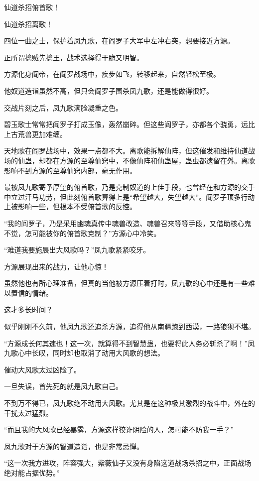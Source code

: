\begin{this_body}
仙道杀招俯首歌！

仙道杀招离歌！

四位一曲之士，保护着凤九歌，在阎罗子大军中左冲右突，想要接近方源。

正所谓擒贼先擒王，战术选择得干脆又明智。

方源化身阎帝，在阎罗战场中，疾步如飞，转移起来，自然轻松至极。

他奴道造诣虽然不高，但只会阎罗子围杀凤九歌，还是能做得很好。

交战片刻之后，凤九歌满脸凝重之色。

碧玉歌士常常把阎罗子打成玉像，轰然崩碎。但这些阎罗子，亦都各个骁勇，远比上古荒兽更加难缠。

天地歌在阎罗战场中，效果一点都不大。离歌能拆解仙阵，但这催发和维持仙道战场的仙蛊，却都在方源的至尊仙窍中，不像仙阵和仙蛊屋，蛊虫都遗留在外。离歌影响不到方源的至尊仙窍内部，毫无作用。

最被凤九歌寄予厚望的俯首歌，乃是克制奴道的上佳手段，也曾经在和方源的交手中立过汗马功劳，但此刻俯首歌算得上是“希望越大，失望越大”。阎罗子顶多行动上被影响一些，但根本不受俯首歌的反控。

“我的阎罗子，乃是采用幽魂真传中魂兽改造、魂兽召来等等手段，又借助核心鬼不觉，怎可能被你的俯首歌克制？”方源心中冷笑。

“难道我要施展出大风歌吗？”凤九歌紧紧咬牙。

方源展现出来的战力，让他心惊！

虽然他也有所心理准备，但真的当他被方源压着打时，凤九歌的心中还是有一些难以置信的情绪。

这才多长时间？

似乎刚刚不久前，他凤九歌还追杀方源，追得他从南疆跑到西漠，一路狼狈不堪。

“方源成长何其速也！这一次，就算得不到智慧蛊，也要将此人务必斩杀了啊！”凤九歌心中长叹，同时却也取消了动用大风歌的想法。

催动大风歌太过凶险了。

一旦失误，首先死的就是凤九歌自己。

不到万不得已，凤九歌绝不动用大风歌。尤其是在这种极其激烈的战斗中，外在的干扰太过猛烈。

“而且我的大风歌已经暴露，方源这样狡诈阴险的人，怎可能不防我一手？”

凤九歌对于方源的智道造诣，也是非常忌惮。

“这一次我方进攻，阵容强大，紫薇仙子又没有身陷这道战场杀招之中，正面战场绝对能占据优势。”


\end{this_body}

